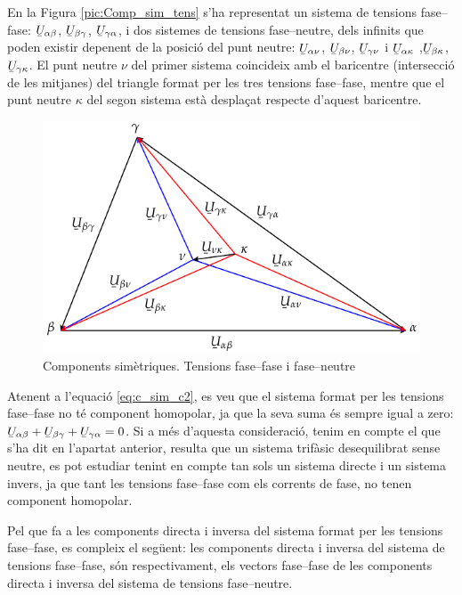 En la Figura \vref{pic:Comp_sim_tens} s'ha representat un sistema de
tensions fase--fase: $\cmplx{U}_{\alpha\beta}$,
$\cmplx{U}_{\beta\gamma}$, $\cmplx{U}_{\gamma\alpha}$, i dos
sistemes de tensions fase--neutre, dels infinits que poden existir
depenent de la posici\'{o} del punt neutre: $\cmplx{U}_{\alpha\nu}$,
$\cmplx{U}_{\beta\nu}$, $\cmplx{U}_{\gamma\nu}$ i
$\cmplx{U}_{\alpha\kappa}$ ,$\cmplx{U}_{\beta\kappa}$,
$\cmplx{U}_{\gamma\kappa}$. El punt neutre $\nu$ del primer sistema
coincideix amb el baricentre (intersecci\'{o} de les mitjanes) del
triangle  format per les tres tensions fase--fase, mentre que el
punt neutre $\kappa$ del segon sistema est\`{a} despla\c{c}at respecte
d'aquest baricentre.
\begin{figure}[htb]
\centering
    \includegraphics{Imatges/Cap-CompSim-Tensions.pdf}
\caption{Components sim\`{e}triques. Tensions fase--fase i fase--neutre}
\label{pic:Comp_sim_tens}
\end{figure}

Atenent a l'equaci\'{o} \eqref{eq:c_sim_c2}, es veu que el sistema
format per les tensions fase--fase no t\'{e} component homopolar, ja que
la seva suma  \'{e}s sempre igual a zero: $\cmplx{U}_{\alpha\beta} +
\cmplx{U}_{\beta\gamma} + \cmplx{U}_{\gamma\alpha} = 0$. Si a m\'{e}s
d'aquesta consideraci\'{o}, tenim en compte el que s'ha dit en l'apartat
anterior, resulta que un sistema trif\`{a}sic desequilibrat sense
neutre, es pot estudiar tenint en compte tan sols un sistema directe
i un sistema invers, ja que tant les tensions fase--fase com els
corrents de fase, no tenen component homopolar.

Pel que fa a les components directa i inversa del sistema format per
les tensions fase--fase, es compleix el seg\"{u}ent: les components
directa i inversa del sistema de tensions fase--fase, s\'{o}n
respectivament, els vectors fase--fase de les components directa i
inversa del sistema de tensions fase--neutre.

